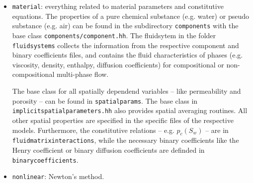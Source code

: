 \begin{itemize}
\item \texttt{material}: everything related to material parameters and
constitutive equations. The properties of a pure chemical substance (e.g. water) or
pseudo substance (e.g. air) can be found in the subdirectory \texttt{components}
with the base class \texttt{components/component.hh}. The fluidsytem in the folder
\texttt{fluidsystems} collects the information from the respective component and
binary coefficients files, and contains the fluid characteristics of phases
(e.g. viscosity, density, enthalpy, diffusion coefficients) for compositional or non-compositional multi-phase flow.

The base class for all spatially dependend variables -- like permeability and porosity  --
can be found in \texttt{spatialparams}. The base class in \texttt{implicitspatialparameters.hh}
also provides spatial averaging routines. All other spatial properties are specified in the specific
 files of the respective models. Furthermore, the constitutive relations --
 e.g. $p_c(S_w) $ -- are in \texttt{fluidmatrixinteractions},
while the necessary binary coefficients like the Henry coefficient or binary diffusion coefficients are definded in
 \texttt{binarycoefficients}.


\item \texttt{nonlinear}: Newton's method.


%
%
%
%
%
%
%
%


\end{itemize}



